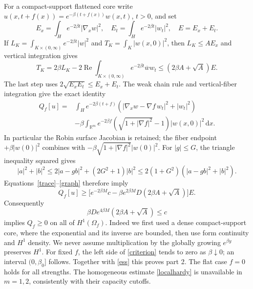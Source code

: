 \documentclass[11pt]{article}
\newcommand{\R}{\mathbb R}
\newcommand{\dd}{\,\mathrm d}
\begin{document}
For a compact-support flattened core write
$u(x,t+f(x))=e^{-\beta(t+f(x))}w(x,t)$, $t>0$, and set
\[
 E_x=\int_H e^{-2\beta t}|\nabla_xw|^2,\quad
 E_t=\int_H e^{-2\beta t}|w_t|^2,\quad E=E_x+E_t.
\]
If $L_K=\int_{K\times(0,\infty)}e^{-2\beta t}|w|^2$
and $T_K=\int_K|w(x,0)|^2$, then
$L_K\le A E_x$ and vertical integration gives
\begin{equation}\label{trace}
 T_K=2\beta L_K-2\operatorname{Re}\int_{K\times(0,\infty)}
   e^{-2\beta t}\overline w w_t
 \le (2\beta A+\sqrt A)E.
\end{equation}
The last step uses $2\sqrt{E_xE_t}\le E_x+E_t$.
The weak chain rule and vertical-fiber integration give the exact identity
\begin{align}\label{graph}
 Q_f[u]={}&\int_H e^{-2\beta(t+f)}
    (|\nabla_xw-\nabla f\,w_t|^2+|w_t|^2)\nonumber\\
 &-\beta\int_{\R^m}e^{-2\beta f}
       (\sqrt{1+|\nabla f|^2}-1)|w(x,0)|^2\dd x.
\end{align}
In particular the Robin surface Jacobian is retained; the fiber endpoint
$+\beta|w(0)|^2$ combines with $-\beta\sqrt{1+|\nabla f|^2}|w(0)|^2$.
For $|g|\le G$, the triangle inequality squared gives
\[
 |a|^2+|b|^2\le2|a-gb|^2+(2G^2+1)|b|^2
 \le2(1+G^2)(|a-gb|^2+|b|^2).
\]
Equations~\eqref{trace}--\eqref{graph} therefore imply
\begin{equation}\label{lower}
 Q_f[u]\ge
 \big[e^{-2\beta M}c-\beta e^{2\beta M}D(2\beta A+\sqrt A)\big]E.
\end{equation}
Consequently
\begin{equation}\label{criterion}
 \beta D e^{4\beta M}(2\beta A+\sqrt A)\le c
\end{equation}
implies $Q_f\ge0$ on all of $H^1(\Omega_f)$. Indeed we first used a dense
compact-support core, where the exponential and its inverse are bounded,
then use form continuity and $H^1$ density. We never assume multiplication
by the globally growing $e^{\beta y}$ preserves $H^1$.
For fixed $f$, the left side of \eqref{criterion} tends to zero as
$\beta\downarrow0$; an interval $(0,\beta_0]$ follows. Together with
\eqref{ess} this proves part 2. The flat case $f=0$ holds for all strengths.
The homogeneous estimate \eqref{localhardy} is unavailable in $m=1,2$,
consistently with their capacity cutoffs.
\end{document}
